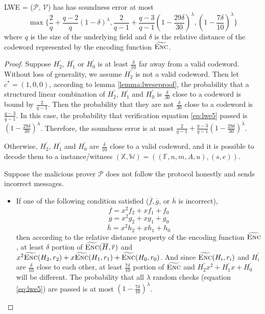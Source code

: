 \begin{lemma}
\label{lemma:lwese}

LWE = ($\mathcal{P}$, $\mathcal{V}$) has has soundness error at most 
$$
    \max
    \biggl\{
    \frac{2}{q} + \frac{q-2}{q}(1 - \delta)^\lambda, 
    \frac{2}{q-1} + \frac{q-3}{q-1}(1 - \frac{29\delta}{30})^\lambda,
    (1 - \frac{7\delta}{10})^\lambda
    \biggr\}
$$
where $q$ is the size of the underlying field and $\delta$ is the relative distance of the codeword represented by the encoding function $\widetilde{\textsc{Enc}}$.

\end{lemma}
\begin{proof}

Suppose $H_2^\prime$, $H_1^\prime$ or $H_0^\prime$ is at least $\frac{\delta}{10}$ far away from a valid codeword. Without loss of generality, we assume $H_2^\prime$ is not a valid codeword. Then let $c^* = (1, 0, 0)$, according to lemma \ref{lemma:lweseproof}, the probability that a structured linear combination of $H_2^\prime$, $H_1^\prime$ and $H_0^\prime$ is $\frac{\delta}{30}$ close to a codeword is bound by $\frac{2}{q-1}$. Then the probability that they are not $\frac{\delta}{30}$ close to a codeword is $\frac{q-3}{q-1}$. In this case, the probability that verification equation \ref{eq:lwe5} passed is $(1 - \frac{29\delta}{30})^\lambda$. Therefore, the soundness error is at most $\frac{2}{q-1} + \frac{q-3}{q-1}(1 - \frac{29\delta}{30})^\lambda$.

Otherwise, $H_2^\prime$, $H_1^\prime$ and $H_0^\prime$ are $\frac{\delta}{10}$ close to a valid codeword, and it is possible to decode them to a instance/witness $(\mathbb{X}, \mathbb{W}) = ((\mathbb{F}, n, m, A, u), (s, e))$. 

Suppose the malicious prover $\mathcal{P}$ does not follow the protocol honestly and sends incorrect messages. 
\begin{itemize}

    \item If one of the following condition satisfied ($\overline{f}, \overline{g}$, or $\overline{h}$ is incorrect),
    $$\overline{f} = x^2f_2 + xf_1 + f_0$$
    $$\overline{g} = x^2g_2 + xg_1 + g_0$$
    $$\overline{h} = x^2h_2 + xh_1 + h_0$$
    then according to the relative distance property of the encoding function $\widetilde{\textsc{Enc}}$, 
    at least $\delta$ portion of $\widetilde{\textsc{Enc}}(\overline{H}, \overline{r})$ and
    $x^2\widetilde{\textsc{Enc}}(H_2, r_2) + x\widetilde{\textsc{Enc}}(H_1, r_1) + \widetilde{\textsc{Enc}}(H_0, r_0)$.
    And since $\widetilde{\textsc{Enc}}(H_i, r_i)$ and $H_i^\prime$ are $\frac{\delta}{10}$ close to each other, at least $\frac{7\delta}{10}$ portion of $\widetilde{\textsc{Enc}}$ and 
    $H_2^\prime x^2 + H_1^\prime x + H_0^\prime$ will be different. The probability that all $\lambda$ random checks (equation \ref{eq:lwe5}) are passed is at most $(1 - \frac{7\delta}{10})^\lambda$.
    

\end{itemize}
\end{proof}
